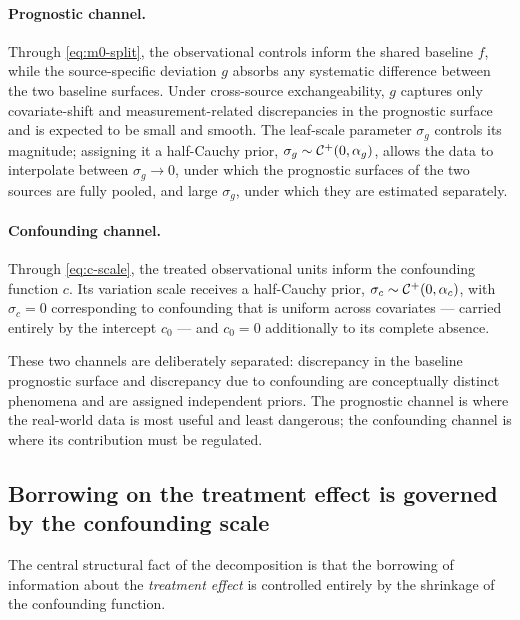\paragraph{Prognostic channel.}
Through \eqref{eq:m0-split}, the observational controls inform the shared
baseline $f$, while the source-specific deviation $g$ absorbs any systematic
difference between the two baseline surfaces. Under cross-source
exchangeability, $g$ captures only covariate-shift and measurement-related
discrepancies in the prognostic surface and is expected to be small and smooth.
The leaf-scale parameter $\sigma_g$ controls its magnitude; assigning it a
half-Cauchy prior, $\sigma_g \sim \mathcal{C}^{+}(0, \alpha_g)$, allows the data to
interpolate between $\sigma_g \to 0$, under which the prognostic surfaces of the
two sources are fully pooled, and large $\sigma_g$, under which they are
estimated separately.

\paragraph{Confounding channel.}
Through \eqref{eq:c-scale}, the treated observational units inform the
confounding function $c$. Its variation scale receives a half-Cauchy prior,
$\sigma_c \sim \mathcal{C}^{+}(0, \alpha_c)$, with $\sigma_c = 0$ corresponding to
confounding that is uniform across covariates --- carried entirely by the
intercept $c_0$ --- and $c_0 = 0$ additionally to its complete absence.

These two channels are deliberately separated: discrepancy in the baseline
prognostic surface and discrepancy due to confounding are conceptually distinct
phenomena and are assigned independent priors. The prognostic channel is where
the real-world data is most useful and least dangerous; the confounding
channel is where its contribution must be regulated.

\subsection{Borrowing on the treatment effect is governed by the confounding scale}

The central structural fact of the decomposition is that the borrowing of
information about the \emph{treatment effect} is controlled entirely by the
shrinkage of the confounding function.

